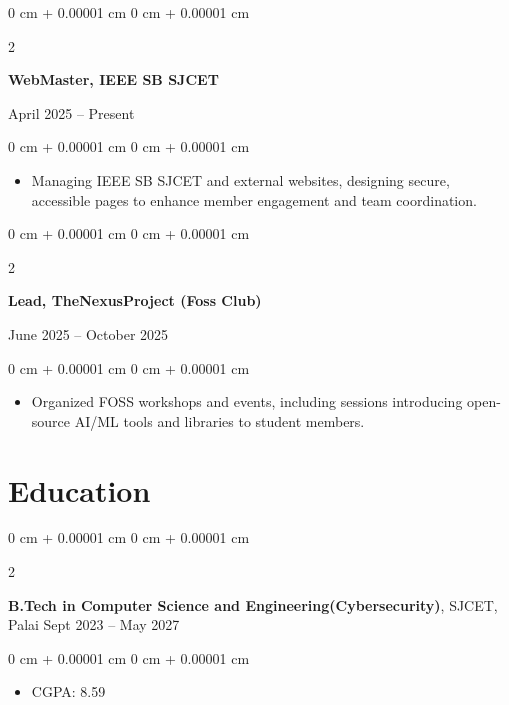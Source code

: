 \documentclass[10pt, a4paper]{article}
\newenvironment{highlights}{
    \begin{itemize}[
        topsep=0.10 cm,
        parsep=0.10 cm,
        partopsep=0pt,
        itemsep=0pt,
        leftmargin=0 cm + 10pt
    ]
}{
    \end{itemize}
} %
\newenvironment{onecolentry}{
    \begin{adjustwidth}{
        0 cm + 0.00001 cm
    }{
        0 cm + 0.00001 cm
    }
}{
    \end{adjustwidth}
} %
\newenvironment{twocolentry}[2][]{
    \onecolentry
    \def\secondColumn{#2}
    \setcolumnwidth{\fill, 4.5 cm}
    \begin{paracol}{2}
}{
    \switchcolumn \raggedleft \secondColumn
    \end{paracol}
    \endonecolentry
} %
\begin{document}
        \vspace{0.2 cm}
        
        \begin{twocolentry}{
            April 2025 – Present
        }
            \textbf{WebMaster, IEEE SB SJCET}
        \end{twocolentry}
        
        \vspace{0.10 cm}
        \begin{onecolentry}
            \begin{highlights}
                \item Managing IEEE SB SJCET and external websites, designing secure, accessible pages to enhance member engagement and team coordination.
            \end{highlights}
        \end{onecolentry}
        
        \vspace{0.2 cm}
        
        \begin{twocolentry}{
            June 2025 – October 2025
        }
            \textbf{Lead, TheNexusProject (Foss Club)}
        \end{twocolentry}
        
        \vspace{0.10 cm}
        \begin{onecolentry}
            \begin{highlights}
                \item Organized FOSS workshops and events, including sessions introducing open-source AI/ML tools and libraries to student members.
            \end{highlights}
        \end{onecolentry}

        \vspace{0.2 cm}

    \section{Education}
     
        \begin{twocolentry}{
            Sept 2023 – May 2027
        }
            \textbf{B.Tech in Computer Science and Engineering(Cybersecurity)},   SJCET, Palai\end{twocolentry}

        \vspace{0.10 cm}
        \begin{onecolentry}
            \begin{highlights}
                \item CGPA: 8.59
            \end{highlights}
        \end{onecolentry}
\end{document}
